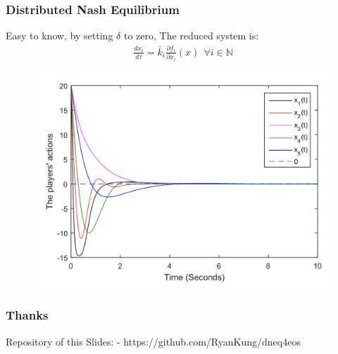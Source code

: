 \documentclass[notheorems, aspectratio=54]{beamer}
\begin{document}
\begin{frame}
  \frametitle{Distributed Nash Equilibrium}
  Easy to know, by setting $\delta$ to zero,  The reduced system is:
  \begin{gather}
    \frac{dx_i}{d\tau} = \bar{k}_i \frac{\partial f_i}{\partial x_i}(x) \ \  \forall i \in \mathbb{N}
  \end{gather}
  \begin{figure}[H]
    \centering
    \includegraphics[width=0.7\linewidth]{nash-eq.png}
  \end{figure}

\end{frame}


\begin{frame}
  \frametitle{Thanks}
  Repository of this Slides:\newline
  - https://github.com/RyanKung/dneq4eos \quad
\end{frame}
\end{document}
